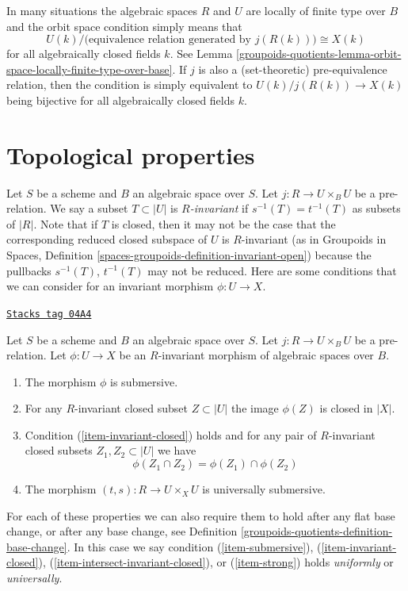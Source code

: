 In many situations the algebraic spaces $R$ and $U$ are locally of finite type
over $B$ and the orbit space condition simply means that
$$
U(k)/\big(\text{equivalence relation generated by }j(R(k))\big)
\cong
X(k)
$$
for all algebraically closed fields $k$. See
Lemma \ref{groupoids-quotients-lemma-orbit-space-locally-finite-type-over-base}.
If $j$ is also a (set-theoretic) pre-equivalence relation, then the condition
is simply equivalent to $U(k)/j(R(k)) \to X(k)$ being bijective for all
algebraically closed fields $k$.

\section{Topological properties}
\label{groupoids-quotients-section-topological}
Let $S$ be a scheme and $B$ an algebraic space over $S$.
Let $j : R \to U \times_B U$ be a pre-relation.
We say a subset $T \subset |U|$ is {\it $R$-invariant} if
$s^{-1}(T) = t^{-1}(T)$ as subsets of $|R|$.
Note that if $T$ is closed, then it may not be the case that
the corresponding reduced closed subspace of $U$ is $R$-invariant
(as in
Groupoids in Spaces, Definition
\ref{spaces-groupoids-definition-invariant-open})
because the pullbacks $s^{-1}(T)$, $t^{-1}(T)$ may not be reduced.
Here are some conditions that we can consider for an
invariant morphism $\phi : U \to X$.

\begin{definition}[Topological]
\label{groupoids-quotients-definition-topological}
\href{https://stacks.math.columbia.edu/tag/04A4}{\texttt{Stacks tag 04A4}}

Let $S$ be a scheme and $B$ an algebraic space over $S$.
Let $j : R \to U \times_B U$ be a pre-relation.
Let $\phi : U \to X$ be an $R$-invariant morphism of algebraic spaces over $B$.
\begin{enumerate}
\item
\label{groupoids-quotients-item-submersive}
The morphism $\phi$ is submersive.
\item
\label{groupoids-quotients-item-invariant-closed}
For any $R$-invariant closed subset $Z \subset |U|$ the image
$\phi(Z)$ is closed in $|X|$.
\item
\label{groupoids-quotients-item-intersect-invariant-closed}
Condition (\ref{item-invariant-closed}) holds and for any pair of
$R$-invariant closed subsets $Z_1, Z_2 \subset |U|$ we have
$$
\phi(Z_1 \cap Z_2) = \phi(Z_1) \cap \phi(Z_2)
$$
\item The morphism $(t, s) : R \to U \times_X U$ is universally submersive.
\label{groupoids-quotients-item-strong}
\end{enumerate}
For each of these properties we can also require them to hold after any
flat base change, or after any base change, see
Definition \ref{groupoids-quotients-definition-base-change}. In this case we say condition
(\ref{item-submersive}),
(\ref{item-invariant-closed}),
(\ref{item-intersect-invariant-closed}), or
(\ref{item-strong}) holds {\it uniformly} or {\it universally}.
\end{definition}

